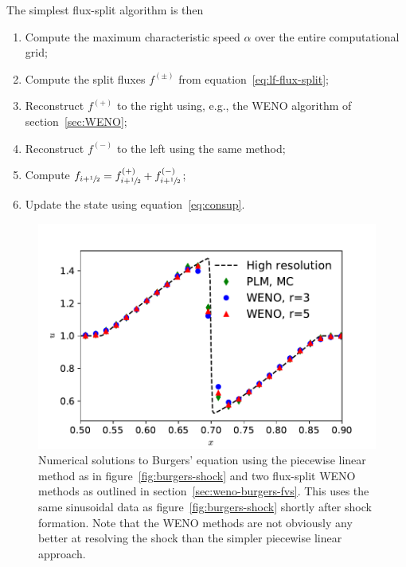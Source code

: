 The simplest flux-split algorithm is then
\begin{enumerate}
  \item Compute the maximum characteristic speed $\alpha$ over the entire computational grid;
  \item Compute the split fluxes $f^{(\pm)}$ from equation~\eqref{eq:lf-flux-split};
  \item Reconstruct $f^{(+)}$ to the right using, e.g., the WENO algorithm of section~\ref{sec:WENO};
  \item Reconstruct $f^{(-)}$ to the left using the same method;
  \item Compute $f_{i+{\sfrac{1}{2}}} = f^{(+)}_{i+{\sfrac{1}{2}}} + f^{(-)}_{i+{\sfrac{1}{2}}}$;
  \item Update the state using equation~\eqref{eq:consup}.
\end{enumerate}

\begin{figure}[t]
\centering
\includegraphics[width=0.8\linewidth]{weno-vs-plm-burger}
\caption[Comparing PLM and WENO methods for Burgers' equation]
{\label{fig:weno-vs-plm-burger} Numerical solutions to Burgers' equation using the piecewise linear method as in figure~\ref{fig:burgers-shock} and two flux-split WENO methods as outlined in section~\ref{sec:weno-burgers-fvs}. This uses the same sinusoidal data as figure~\ref{fig:burgers-shock} shortly after shock formation. Note that the WENO methods are not obviously any better at resolving the shock than the simpler piecewise linear approach.\\
}
\end{figure}
%

